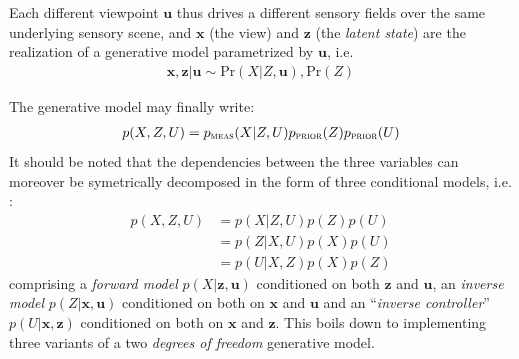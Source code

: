 \documentclass[12pt,twoside,openright]{article}
\begin{document}
Each different viewpoint $\boldsymbol{u}$ thus drives a different sensory fields over the same underlying sensory scene, and $\boldsymbol{x}$ (the view) and $\boldsymbol{z}$ (the \emph{latent state}) are the realization of a generative model parametrized by $\boldsymbol{u}$, i.e.
\begin{align}
\boldsymbol{x}, \boldsymbol{z} | \boldsymbol{u} \sim \text{Pr}(X|Z, \boldsymbol{u}), \text{Pr}(Z)
\end{align}  

The generative model may finally write:
\begin{align}
p(X, Z, U) = p_\text{\sc meas}(X| Z, U)p_\text{\sc prior}(Z) p_\text{\sc prior}(U)
\end{align}
It should be noted that the dependencies between the three variables can moreover be symetrically decomposed in the form of three conditional models, i.e. :
\begin{align}
p(X, Z, U) &= p(X| Z, U) p(Z)p(U)\nonumber\\ 
&= p(Z| X, U)p(X) p(U)\nonumber\\
&= p(U|X, Z)p(X) p(Z)\label{eq:three-party}
\end{align}
comprising a \emph{forward model} $p(X|\boldsymbol{z}, \boldsymbol{u})$ 
conditioned on both $\boldsymbol{z}$ and $\boldsymbol{u}$,  an \emph{inverse model} $p(Z|\boldsymbol{x}, \boldsymbol{u})$  conditioned on both on  $\boldsymbol{x}$ and $\boldsymbol{u}$ and an ``\emph{inverse controller}'' $p(U|\boldsymbol{x}, \boldsymbol{z})$ conditioned on both on  $\boldsymbol{x}$ and $\boldsymbol{z}$. This boils down to implementing three variants of a two \emph{degrees of freedom} generative model. 




\end{document}
